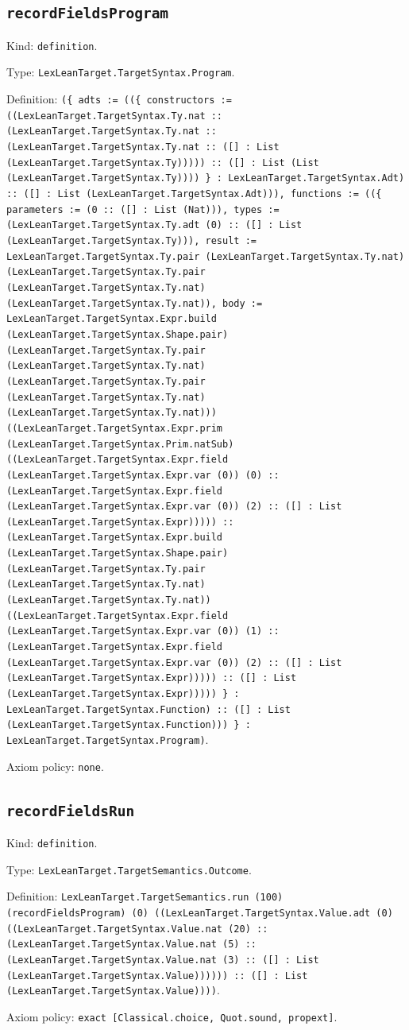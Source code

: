\documentclass[11pt]{article}
\begin{document}
\subsection*{\texttt{recordFieldsProgram}}
\noindent Kind: \texttt{definition}.\par
\noindent Type: \texttt{LexLeanTarget.TargetSyntax.Program}.\par
\noindent Definition: \texttt{(\{ adts := ((\{ constructors := ((LexLeanTarget.TargetSyntax.Ty.nat :: (LexLeanTarget.TargetSyntax.Ty.nat :: (LexLeanTarget.TargetSyntax.Ty.nat :: ([] : List (LexLeanTarget.TargetSyntax.Ty))))) :: ([] : List (List (LexLeanTarget.TargetSyntax.Ty)))) \} : LexLeanTarget.TargetSyntax.Adt) :: ([] : List (LexLeanTarget.TargetSyntax.Adt))), functions := ((\{ parameters := (0 :: ([] : List (Nat))), types := (LexLeanTarget.TargetSyntax.Ty.adt (0) :: ([] : List (LexLeanTarget.TargetSyntax.Ty))), result := LexLeanTarget.TargetSyntax.Ty.pair (LexLeanTarget.TargetSyntax.Ty.nat) (LexLeanTarget.TargetSyntax.Ty.pair (LexLeanTarget.TargetSyntax.Ty.nat) (LexLeanTarget.TargetSyntax.Ty.nat)), body := LexLeanTarget.TargetSyntax.Expr.build (LexLeanTarget.TargetSyntax.Shape.pair) (LexLeanTarget.TargetSyntax.Ty.pair (LexLeanTarget.TargetSyntax.Ty.nat) (LexLeanTarget.TargetSyntax.Ty.pair (LexLeanTarget.TargetSyntax.Ty.nat) (LexLeanTarget.TargetSyntax.Ty.nat))) ((LexLeanTarget.TargetSyntax.Expr.prim (LexLeanTarget.TargetSyntax.Prim.natSub) ((LexLeanTarget.TargetSyntax.Expr.field (LexLeanTarget.TargetSyntax.Expr.var (0)) (0) :: (LexLeanTarget.TargetSyntax.Expr.field (LexLeanTarget.TargetSyntax.Expr.var (0)) (2) :: ([] : List (LexLeanTarget.TargetSyntax.Expr))))) :: (LexLeanTarget.TargetSyntax.Expr.build (LexLeanTarget.TargetSyntax.Shape.pair) (LexLeanTarget.TargetSyntax.Ty.pair (LexLeanTarget.TargetSyntax.Ty.nat) (LexLeanTarget.TargetSyntax.Ty.nat)) ((LexLeanTarget.TargetSyntax.Expr.field (LexLeanTarget.TargetSyntax.Expr.var (0)) (1) :: (LexLeanTarget.TargetSyntax.Expr.field (LexLeanTarget.TargetSyntax.Expr.var (0)) (2) :: ([] : List (LexLeanTarget.TargetSyntax.Expr))))) :: ([] : List (LexLeanTarget.TargetSyntax.Expr))))) \} : LexLeanTarget.TargetSyntax.Function) :: ([] : List (LexLeanTarget.TargetSyntax.Function))) \} : LexLeanTarget.TargetSyntax.Program)}.\par
\noindent Axiom policy: \texttt{none}.\par
\subsection*{\texttt{recordFieldsRun}}
\noindent Kind: \texttt{definition}.\par
\noindent Type: \texttt{LexLeanTarget.TargetSemantics.Outcome}.\par
\noindent Definition: \texttt{LexLeanTarget.TargetSemantics.run (100) (recordFieldsProgram) (0) ((LexLeanTarget.TargetSyntax.Value.adt (0) ((LexLeanTarget.TargetSyntax.Value.nat (20) :: (LexLeanTarget.TargetSyntax.Value.nat (5) :: (LexLeanTarget.TargetSyntax.Value.nat (3) :: ([] : List (LexLeanTarget.TargetSyntax.Value)))))) :: ([] : List (LexLeanTarget.TargetSyntax.Value))))}.\par
\noindent Axiom policy: \texttt{exact [Classical.choice, Quot.sound, propext]}.\par
\end{document}
